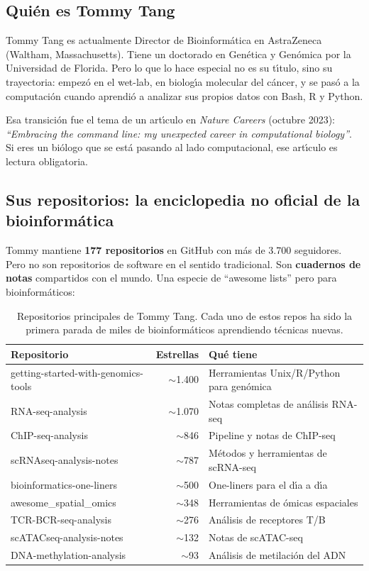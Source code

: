 \documentclass[11pt]{article}
\begin{document}
\subsection{Qui\'{e}n es Tommy Tang}

Tommy Tang es actualmente Director de Bioinform\'{a}tica en AstraZeneca (Waltham, Massachusetts). Tiene un doctorado en Gen\'{e}tica y Gen\'{o}mica por la Universidad de Florida. Pero lo que lo hace especial no es su t\'{\i}tulo, sino su trayectoria: empez\'{o} en el wet-lab, en biolog\'{\i}a molecular del c\'{a}ncer, y se pas\'{o} a la computaci\'{o}n cuando aprendi\'{o} a analizar sus propios datos con Bash, R y Python.

Esa transici\'{o}n fue el tema de un art\'{\i}culo en \textit{Nature Careers} (octubre 2023): \textit{``Embracing the command line: my unexpected career in computational biology''}. Si eres un bi\'{o}logo que se est\'{a} pasando al lado computacional, ese art\'{\i}culo es lectura obligatoria.

\subsection{Sus repositorios: la enciclopedia no oficial de la bioinform\'{a}tica}

Tommy mantiene \textbf{177 repositorios} en GitHub con m\'{a}s de 3.700 seguidores. Pero no son repositorios de software en el sentido tradicional. Son \textbf{cuadernos de notas} compartidos con el mundo. Una especie de ``awesome lists'' pero para bioinform\'{a}ticos:

\begin{table}[H]
    \centering
    \begin{tabular}{lrl}
        \toprule
        \textbf{Repositorio} & \textbf{Estrellas} & \textbf{Qu\'{e} tiene} \\
        \midrule
        getting-started-with-genomics-tools & $\sim$1.400 & Herramientas Unix/R/Python para gen\'{o}mica \\
        RNA-seq-analysis & $\sim$1.070 & Notas completas de an\'{a}lisis RNA-seq \\
        ChIP-seq-analysis & $\sim$846 & Pipeline y notas de ChIP-seq \\
        scRNAseq-analysis-notes & $\sim$787 & M\'{e}todos y herramientas de scRNA-seq \\
        bioinformatics-one-liners & $\sim$500 & One-liners para el d\'{\i}a a d\'{\i}a \\
        awesome\_spatial\_omics & $\sim$348 & Herramientas de \'{o}micas espaciales \\
        TCR-BCR-seq-analysis & $\sim$276 & An\'{a}lisis de receptores T/B \\
        scATACseq-analysis-notes & $\sim$132 & Notas de scATAC-seq \\
        DNA-methylation-analysis & $\sim$93 & An\'{a}lisis de metilaci\'{o}n del ADN \\
        \bottomrule
    \end{tabular}
    \caption{Repositorios principales de Tommy Tang. Cada uno de estos repos ha sido la primera parada de miles de bioinform\'{a}ticos aprendiendo t\'{e}cnicas nuevas.}
\end{table}
\end{document}
